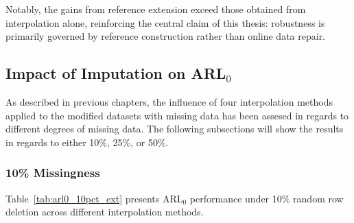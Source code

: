 Notably, the gains from reference extension exceed those obtained from interpolation alone, reinforcing the central claim of this thesis: robustness is primarily governed by reference construction rather than online data repair.



\subsection{Impact of Imputation on \ac{ARL}$_0$}

As described in previous chapters, the influence of four interpolation methods applied to the modified datasets with missing data has been assesed in regards to different degrees of missing data. The following subsections will show the results in regards to either 10\%, 25\%, or 50\%.

\subsubsection{10\% Missingness}

Table~\ref{tab:arl0_10pct_ext} presents \ac{ARL}$_0$ performance under 10\% random row deletion across different interpolation methods. 


